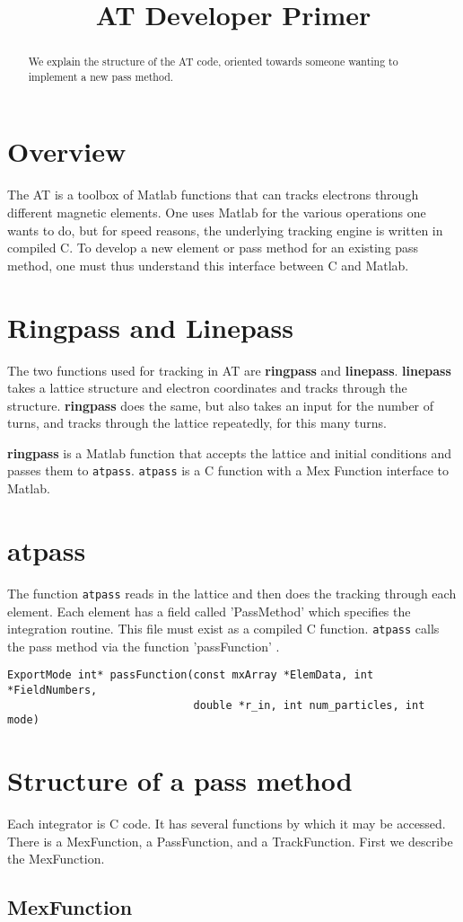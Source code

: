 \label{quadplot}\documentclass[acus]{article}
\newcommand{\mfun}[1]{{\bf{#1}}}
\newcommand{\cfun}[1]{{\texttt{#1}}}
\begin{document}
\title{AT Developer Primer}
\maketitle
\begin{abstract}
We explain the structure of the AT code, oriented towards someone wanting to implement a new pass method.
\end{abstract}

\section{Overview}
The AT is a toolbox of Matlab functions that can tracks electrons through different magnetic elements. 
One uses Matlab for the various operations one wants to do, but for speed reasons, the underlying
tracking engine is written in compiled C.  To develop a new element or pass method for an existing pass
method, one must thus understand this interface between C and Matlab.

\section{Ringpass and Linepass} 
The two functions used for tracking 
in AT are \mfun{ringpass} and \mfun{linepass}.  \mfun{linepass} takes a lattice structure
and electron coordinates and tracks through the structure.  \mfun{ringpass} does the same, but also takes
 an input for the number of turns, and tracks through the lattice repeatedly, for this many turns.

\mfun{ringpass} is a Matlab function that accepts the lattice and initial conditions and passes them to \cfun{atpass}.  
\cfun{atpass} is a C function with a Mex Function interface to Matlab.
\section{atpass}
The function \cfun{atpass} reads in the lattice and then does the tracking through each element.  Each element has a field
called 'PassMethod' which specifies the integration routine.  This file must exist as a compiled C function.  \cfun{atpass} calls the
pass method via the function 'passFunction' .
\begin{verbatim}
ExportMode int* passFunction(const mxArray *ElemData, int *FieldNumbers,
                             double *r_in, int num_particles, int mode)
\end{verbatim}

\section{Structure of a pass method}
Each integrator is C code.  It has several functions by which it may be accessed.  There is a 
MexFunction, a PassFunction, and a TrackFunction.
First we describe the MexFunction.
\subsection{MexFunction}



\begin{thebibliography}{4}

\end{thebibliography}
\end{document}
